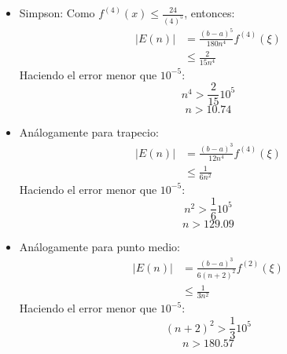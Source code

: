 \begin{frame}
    \begin{itemize}
        \item Simpson:
              Como $f^{(4)}(x)\leq\frac{24}{(4)^5}$, entonces:
              \begin{align*}
                  |E(n)| & =\frac{(b-a)^5}{180n^4}f^{(4)}(\xi) \\
                         & \leq \frac{2}{15n^4}
              \end{align*}
              Haciendo el error menor que $10^{-5}$:
              $$n^4>\frac{2}{15}10^5$$
              $$n>10.74$$
        \item Análogamente para trapecio:
              \begin{align*}
                  |E(n)| & =\frac{(b-a)^3}{12n^4}f^{(4)}(\xi) \\
                         & \leq \frac{1}{6n^2}
              \end{align*}
              Haciendo el error menor que $10^{-5}$:
              $$n^2>\frac{1}{6}10^5$$
              $$n>129.09$$
    \end{itemize}
\end{frame}

\begin{frame}
    \begin{itemize}
        \item

              Análogamente para punto medio:
              \begin{align*}
                  |E(n)| & =\frac{(b-a)^3}{6(n+2)^2}f^{(2)}(\xi) \\
                         & \leq \frac{1}{3n^2}
              \end{align*}
              Haciendo el error menor que $10^{-5}$:
              $$(n+2)^2>\frac{1}{3}10^5$$
              $$n>180.57$$
    \end{itemize}
\end{frame}
